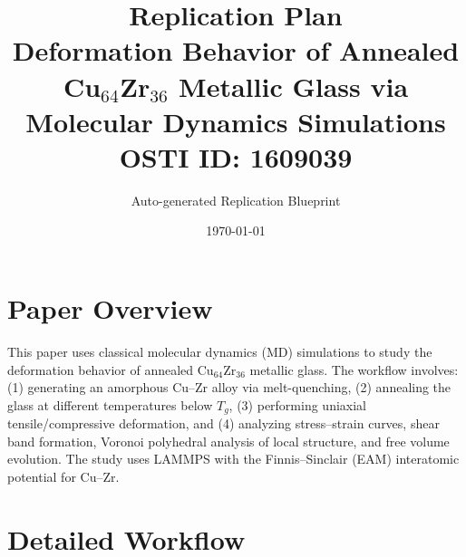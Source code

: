\documentclass[11pt,a4paper]{article}
\title{\textbf{Replication Plan}\\[0.5em]
\large Deformation Behavior of Annealed Cu$_{64}$Zr$_{36}$ Metallic Glass via Molecular Dynamics Simulations\\[0.3em]
\normalsize OSTI ID: 1609039}
\author{Auto-generated Replication Blueprint}
\date{\today}
\begin{document}
\maketitle
\tableofcontents
\newpage

\section{Paper Overview}
This paper uses classical molecular dynamics (MD) simulations to study the deformation behavior of annealed Cu$_{64}$Zr$_{36}$ metallic glass. The workflow involves: (1) generating an amorphous Cu--Zr alloy via melt-quenching, (2) annealing the glass at different temperatures below $T_g$, (3) performing uniaxial tensile/compressive deformation, and (4) analyzing stress--strain curves, shear band formation, Voronoi polyhedral analysis of local structure, and free volume evolution. The study uses LAMMPS with the Finnis--Sinclair (EAM) interatomic potential for Cu--Zr.

\section{Detailed Workflow}
\end{document}
